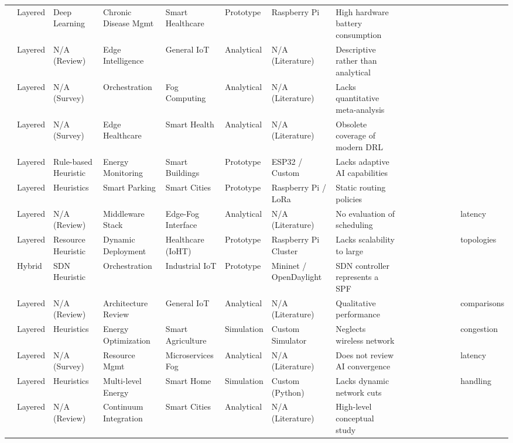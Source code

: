 \documentclass[conference]{IEEEtran}
\begin{document}
\begin{table}[p]
\begin{tabular}{llllllll}
\cite{b13} & Layered & Deep Learning & Chronic Disease Mgmt & Smart Healthcare & Prototype & Raspberry Pi & High hardware battery consumption \\
\cite{b14} & Layered & N/A (Review) & Edge Intelligence & General IoT & Analytical & N/A (Literature) & Descriptive rather than analytical \\
\cite{b15} & Layered & N/A (Survey) & Orchestration & Fog Computing & Analytical & N/A (Literature) & Lacks quantitative meta-analysis \\
\cite{b16} & Layered & N/A (Survey) & Edge Healthcare & Smart Health & Analytical & N/A (Literature) & Obsolete coverage of modern DRL \\
\cite{b17} & Layered & Rule-based Heuristic & Energy Monitoring & Smart Buildings & Prototype & ESP32 / Custom & Lacks adaptive AI capabilities \\
\cite{b18} & Layered & Heuristics & Smart Parking & Smart Cities & Prototype & Raspberry Pi / LoRa & Static routing policies \\
\cite{b19} & Layered & N/A (Review) & Middleware Stack & Edge-Fog Interface & Analytical & N/A (Literature) & No evaluation of scheduling &&&&&&&& latency \\
\cite{b20} & Layered & Resource Heuristic & Dynamic Deployment & Healthcare (IoHT) & Prototype & Raspberry Pi Cluster & Lacks scalability to large &&&&&&&& topologies \\
\cite{b21} & Hybrid & SDN Heuristic & Orchestration & Industrial IoT & Prototype & Mininet / OpenDaylight & SDN controller represents a SPF \\
\cite{b22} & Layered & N/A (Review) & Architecture Review & General IoT & Analytical & N/A (Literature) & Qualitative performance &&&&&&&& comparisons \\
\cite{b23} & Layered & Heuristics & Energy Optimization & Smart Agriculture & Simulation & Custom Simulator & Neglects wireless network &&&&&&&& congestion \\
\cite{b24} & Layered & N/A (Survey) & Resource Mgmt & Microservices Fog & Analytical & N/A (Literature) & Does not review AI convergence &&&&&&&& latency \\
\cite{b25} & Layered & Heuristics & Multi-level Energy & Smart Home & Simulation & Custom (Python) & Lacks dynamic network cuts &&&&&&&& handling \\
\cite{b26} & Layered & N/A (Review) & Continuum Integration & Smart Cities & Analytical & N/A (Literature) & High-level conceptual study \\

\end{tabular}
\end{table}
\end{document}
